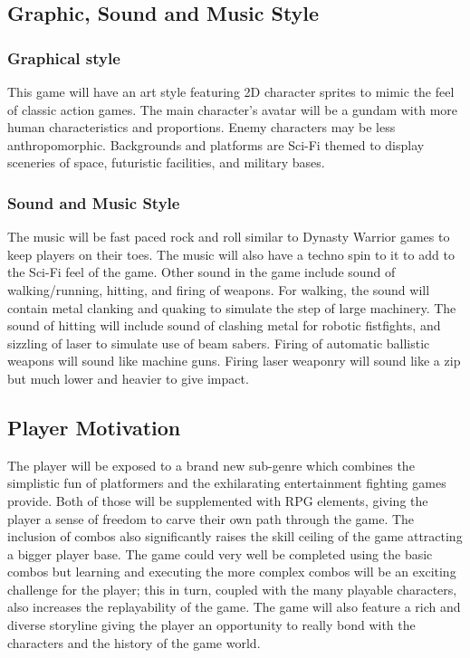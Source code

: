 \documentclass{article}
\begin{document}
\subsection*{Graphic, Sound and Music Style}
    \subsubsection*{Graphical style}
    This game will have an art style featuring 2D character sprites to mimic the feel of classic action games. The main character’s avatar will be a gundam with more human characteristics and proportions. Enemy characters may be less anthropomorphic. Backgrounds and platforms are Sci-Fi themed to display sceneries of space, futuristic facilities, and military bases.
    \subsubsection*{Sound and Music Style}
    The music will be fast paced rock and roll similar to Dynasty Warrior games to keep players on their toes. The music will also have a techno spin to it to add to the Sci-Fi feel of the game. Other sound in the game include sound of walking/running, hitting, and firing of weapons. For walking, the sound will contain metal clanking and quaking to simulate the step of large machinery. The sound of hitting will include sound of clashing metal for robotic fistfights, and sizzling of laser to simulate use of beam sabers. Firing of automatic ballistic weapons will sound like machine guns. Firing laser weaponry will sound like a zip but much lower and heavier to give impact.
    
\subsection*{Player Motivation}
The player will be exposed to a brand new sub-genre which combines the simplistic fun of platformers and the exhilarating entertainment fighting games provide. Both of those will be supplemented with RPG elements, giving the player a sense of freedom to carve their own path through the game. The inclusion of combos also significantly raises the skill ceiling of the game attracting a bigger player base. The game could very well be completed using the basic combos but learning and executing the more complex combos will be an exciting challenge for the player; this in turn, coupled with the many playable characters, also increases the replayability of the game. The game will also feature a rich and diverse storyline giving the player an opportunity to really bond with the characters and the history of the game world. 	
\end{document}
